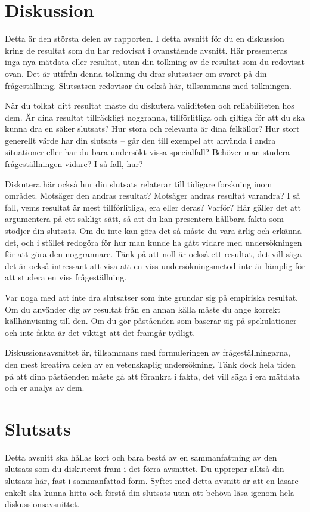 \documentclass{article}
\begin{document}
\section{Diskussion}
Detta är den största delen av rapporten. I detta avsnitt för du en diskussion kring de resultat som du har redovisat i ovanstående avsnitt. Här presenteras inga nya mätdata eller resultat, utan din tolkning av de resultat som du redovisat ovan. Det är utifrån denna tolkning du drar slutsatser om svaret på din frågeställning. Slutsatsen redovisar du också här, tillsammans med tolkningen.

När du tolkat ditt resultat måste du diskutera validiteten och reliabiliteten hos dem. Är dina resultat tillräckligt noggranna, tillförlitliga och giltiga för att du ska kunna dra en säker slutsats? Hur stora och relevanta är dina felkällor? Hur stort generellt värde har din slutsats – går den till exempel att använda i andra situationer eller har du bara undersökt vissa specialfall? Behöver man studera frågeställningen vidare? I så fall, hur?

Diskutera här också hur din slutsats relaterar till tidigare forskning inom området. Motsäger den andras resultat? Motsäger andras resultat varandra? I så fall, vems resultat är mest tillförlitliga, era eller deras? Varför? Här gäller det att argumentera på ett sakligt sätt, så att du kan presentera hållbara fakta som stödjer din slutsats. Om du inte kan göra det så måste du vara ärlig och erkänna det, och i stället redogöra för hur man kunde ha gått vidare med undersökningen för att göra den noggrannare. Tänk på att noll är också ett resultat, det vill säga det är också intressant att visa att en viss undersökningsmetod inte är lämplig för att studera en viss frågeställning.

Var noga med att inte dra slutsatser som inte grundar sig på empiriska resultat. Om du använder dig av resultat från en annan källa måste du ange korrekt källhänvisning till den. Om du gör påståenden som baserar sig på spekulationer och inte fakta är det viktigt att det framgår tydligt.

Diskussionsavsnittet är, tillsammans med formuleringen av frågeställningarna, den mest kreativa delen av en vetenskaplig undersökning. Tänk dock hela tiden på att dina påståenden måste gå att förankra i fakta, det vill säga i era mätdata och er analys av dem.

\section{Slutsats}
Detta avsnitt ska hållas kort och bara bestå av en sammanfattning av den slutsats som du diskuterat fram i det förra avsnittet. Du upprepar alltså din slutsats här, fast i sammanfattad form. Syftet med detta avsnitt är att en läsare enkelt ska kunna hitta och förstå din slutsats utan att behöva läsa igenom hela diskussionsavsnittet.
\end{document}
